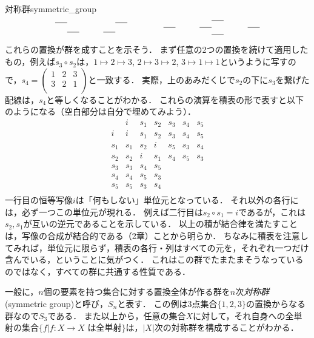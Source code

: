 \documentclass[11pt,a4paper]{jsarticle}
\begin{document}
\begin{rei}{対称群}{symmetric_group}
\[\begin{tikzpicture}
        \draw (0,.7) -- (.5,.7);
        \draw (.5,.3) -- (1,.3);
    
        \draw (2,.3) -- (2.5,.3);
        \draw (2.5,.7) -- (3,.7);
    
        \draw (4.5,.5) -- (5,.5);
    
        \draw (7,.8) -- (6.5,.8);
        \draw (6,.5) -- (6.5,.5);
        \draw (7,.2) -- (6.5,.2);
    
        \draw (8,.5) -- (8.5,.5);
    \end{tikzpicture}\]    

    これらの置換が群を成すことを示そう．
    まず任意の2つの置換を続けて適用したもの，例えば$s_3 \circ s_2$は，$1\mapsto2\mapsto3$, $2\mapsto3\mapsto2$, $3\mapsto1\mapsto1$というように写すので，$ s_4 = 
    \left( \begin{smallmatrix}
        1 & 2 & 3 \\
        3 & 2 & 1 \\
    \end{smallmatrix} \right)$と一致する．
    実際，上のあみだくじで$s_2$の下に$s_3$を繋げた配線は，$s_4$と等しくなることがわかる．
    これらの演算を積表の形で表すと以下のようになる（空白部分は自分で埋めてみよう）．
    \[
        \begin{array}{c|cccccc}
               & i & s_1 & s_2 & s_3 & s_4 & s_5 \\ \hline
               i & i & s_1 & s_2 & s_3 & s_4 & s_5 \\ 
               s_1 & s_1 & s_2 & i &  s_5 & s_3 & s_4  \\ 
               s_2 & s_2 & i & s_1 &  s_4 & s_5 & s_3 \\ 
               s_3 & s_3 & s_4 & s_5 &  &  &  \\ 
               s_4 & s_4 & s_5 & s_3 & & &  \\ 
               s_5 & s_5 & s_3 & s_4 & &  &  \\ 
             
        \end{array}
    \]
    一行目の恒等写像$i$は「何もしない」単位元となっている．
    それ以外の各行には，必ず一つこの単位元が現れる．
    例えば二行目は$s_2 \circ s_1 = i$であるが，これは$s_2, s_1$が互いの逆元であることを示している．
    以上の積が結合律を満たすことは，写像の合成が結合的である（2章）ことから明らか．
    ちなみに積表を注意してみれば，単位元に限らず，積表の各行・列はすべての元を，それぞれ一つだけ含んでいる，ということに気がつく．
    これはこの群でたまたまそうなっているのではなく，すべての群に共通する性質である．

    一般に，$n$個の要素を持つ集合に対する置換全体が作る群を$n$次\emph{対称群}(symmetric group)と呼び，$S_n$と表す．
    この例は3点集合$\{1, 2, 3\}$の置換からなる群なので$S_3$である．
    また以上から，任意の集合$X$に対して，それ自身への全単射の集合$\{f | f:X \to X \text{ は全単射} \}$は，$|X|$次の対称群を構成することがわかる．
\end{rei}
\end{document}
